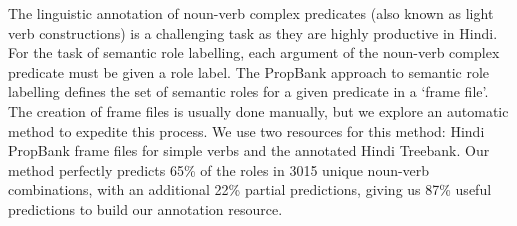 The linguistic annotation of noun-verb complex predicates (also known as light verb constructions) is a challenging task as they are highly productive in
 Hindi. For the task of semantic role
 labelling, each argument of the noun-verb complex predicate must be given a
 role label. The PropBank approach to semantic role labelling defines the set of
 semantic roles for a given predicate in a ‘frame file'. The creation of
 frame files is usually done manually, but we explore an automatic method to
 expedite this process. We use two resources for this method: Hindi PropBank
 frame files for simple verbs and the annotated Hindi Treebank. Our method
 perfectly predicts 65\% of the roles in 3015 unique noun-verb combinations, with
 an additional 22\% partial predictions, giving us 87\% useful predictions
 to build our annotation resource.

